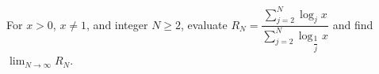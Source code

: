 For $x>0$, $x\ne1$, and integer $N\ge2$, evaluate $R_N = \dfrac{\sum_{j=2}^N\log_jx}{\sum_{j=2}^N \log_{\dfrac{1}{j}} x}$ and find $\lim_{N\to\infty}R_N$.
